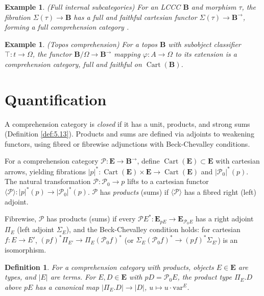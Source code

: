 \documentclass{article}
\theoremstyle{plain}
\newtheorem{definition}[theorem]{Definition}
\newtheorem{example}[theorem]{Example}
\theoremstyle{remark}
\begin{document}
\begin{example}
\label{ex:4.6}
(Full internal subcategories) For an LCCC $\mathbf{B}$ and morphism $\tau$, the fibration $\Sigma(\tau) \to \mathbf{B}$ has a full and faithful cartesian functor $\Sigma(\tau) \to \mathbf{B}^{\to}$, forming a full comprehension category \cite{Pitts1987, Johnstone1977}.
\end{example}

\begin{example}
\label{ex:4.7}
(Topos comprehension) For a topos $\mathbf{B}$ with subobject classifier $\top : t \to \Omega$, the functor $\mathbf{B}/\Omega \to \mathbf{B}^{\to}$ mapping $\varphi : A \to \Omega$ to its extension is a comprehension category, full and faithful on $\operatorname{Cart}(\mathbf{B})$.
\end{example}

\section{Quantification}
\label{sec:quantification}

A comprehension category is \emph{closed} if it has a unit, products, and strong sums (Definition \ref{def:5.13}). Products and sums are defined via adjoints to weakening functors, using fibred or fibrewise adjunctions with Beck-Chevalley conditions.

For a comprehension category $\mathscr{P} : \mathbf{E} \to \mathbf{B}^{\to}$, define $\operatorname{Cart}(\mathbf{E}) \subset \mathbf{E}$ with cartesian arrows, yielding fibrations $|p|^* : \operatorname{Cart}(\mathbf{E}) \times \mathbf{E} \to \operatorname{Cart}(\mathbf{E})$ and $|\mathscr{P}_0|^*(p)$. The natural transformation $\mathscr{P} : \mathscr{P}_0 \to p$ lifts to a cartesian functor $\langle \mathscr{P} \rangle : |p|^*(p) \to |\mathscr{P}_0|^*(p)$. $\mathscr{P}$ has \emph{products} (sums) if $\langle \mathscr{P} \rangle$ has a fibred right (left) adjoint.

Fibrewise, $\mathscr{P}$ has products (sums) if every $\mathscr{P} E^* : \mathbf{E}_{p E} \to \mathbf{E}_{\mathscr{P}_0 E}$ has a right adjoint $\Pi_E$ (left adjoint $\Sigma_E$), and the Beck-Chevalley condition holds: for cartesian $f : E \to E'$, $(p f)^* \Pi_{E'} \to \Pi_E (\mathscr{P}_0 f)^*$ (or $\Sigma_E (\mathscr{P}_0 f)^* \to (p f)^* \Sigma_{E'}$) is an isomorphism.

\begin{definition}
\label{def:5.1}
For a comprehension category with products, objects $E \in \mathbf{E}$ are \emph{types}, and $|E|$ are \emph{terms}. For $E, D \in \mathbf{E}$ with $p D = \mathscr{P}_0 E$, the product type $\Pi_E . D$ above $p E$ has a canonical map $|\Pi_E . D| \to |D|$, $u \mapsto u \cdot \text{var}^E$.
\end{definition}
\end{document}
